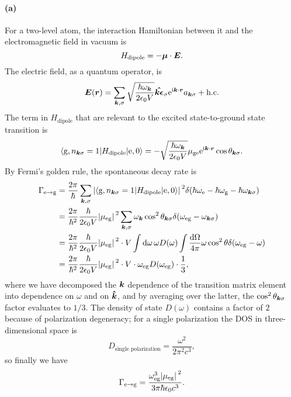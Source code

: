 \documentclass[hyperref, a4paper]{article}
\newcommand*{\ii}{\mathrm{i}}
\newcommand*{\ee}{\mathrm{e}}
\newcommand*{\omegae}{\omega_{\text{e}}}
\newcommand*{\omegag}{\omega_{\text{g}}}
\newcommand*{\omegaeg}{\omega_{\text{eg}}}
\newcommand*{\mueg}{\mu_{\text{eg}}}
\newcommand*{\muge}{\mu_{\text{ge}}}
\begin{document}
\paragraph{(a)} For a two-level atom, 
the interaction Hamiltonian between it and the electromagnetic field in vacuum is 
\begin{equation}
    H_{\text{dipole}} = - \vb*{\mu} \cdot \vb*{E}.
\end{equation}
The electric field, as a quantum operator, is 
\begin{equation}
    \vb*{E}(\vb*{r}) = \sum_{\vb*{k}, \sigma}
    \sqrt{\frac{\hbar \omega_{\vb*{k}}}{2 \epsilon_0 V}}
    \vu*{\vb*{k} \epsilon}_\sigma \ee^{\ii \vb*{k} \cdot \vb*{r}} a_{\vb*{k} \sigma} 
    + \text{h.c.}
\end{equation}
The term in $H_{\text{dipole}}$ that are relevant to 
the excited state-to-ground state transition is  
\begin{equation}
    \mel**{\text{g}, n_{\vb*{k} \sigma} = 1}{H_{\text{dipole}}}{\text{e}, 0}
    = - \sqrt{\frac{\hbar \omega_{\vb*{k}}}{2 \epsilon_0 V}} 
    \muge \ee^{\ii \vb*{k} \cdot \vb*{r}} \cos \theta_{\vb*{k} \sigma}.
\end{equation}
By Fermi's golden rule, the spontaneous decay rate is 
\begin{equation}
    \begin{aligned}
        \Gamma_{\text{e} \to \text{g}} &= 
        \frac{2\pi}{\hbar} \sum_{\vb*{k}, \sigma} 
        \abs*{
            \mel**{\text{g}, n_{\vb*{k} \sigma} = 1}{H_{\text{dipole}}}{\text{e}, 0}
        }^2
        \delta(\hbar \omegae - \hbar \omegag - \hbar \omega_{\vb*{k} \sigma}) \\
        &= \frac{2\pi}{\hbar^2} \frac{\hbar}{2 \epsilon_0 V}  \abs*{\mueg}^2 
        \sum_{\vb*{k}, \sigma} \omega_{\vb*{k}}
        \cos^2 \theta_{\vb*{k} \sigma} 
        \delta(\omegaeg - \omega_{\vb*{k} \sigma}) \\
        &= \frac{2\pi}{\hbar^2} \frac{\hbar}{2 \epsilon_0 V} \abs*{\mueg}^2 
        \cdot V \int \dd{\omega} \omega D(\omega) \int \frac{\dd{\Omega}}{4\pi} 
        \omega  \cos^2 \theta
        \delta(\omegaeg - \omega)  \\
        &= \frac{2\pi}{\hbar^2} \frac{\hbar}{2 \epsilon_0 V} \abs*{\mueg}^2 
        \cdot V \cdot \omegaeg D(\omegaeg) \cdot \frac{1}{3} ,
    \end{aligned}
\end{equation}
where we have decomposed the $\vb*{k}$ dependence 
of the transition matrix element 
into dependence on $\omega$ and on $\vu*{k}$,
and by averaging over the latter, 
the $\cos^2 \theta_{\vb*{k} \sigma}$  factor evaluates to $1/3$.
The density of state $D(\omega)$ contains a factor of $2$ 
because of polarization degeneracy;
for a single polarization the DOS in three-dimensional space is 
\begin{equation}
    D_{\text{single polarization}} = \frac{\omega^2}{2 \pi^2 c^3},
\end{equation}
so finally we have 
\begin{equation}
    \Gamma_{\text{e} \to \text{g}} = \frac{
        \omegaeg^3 \abs*{\mueg}^2
    }{
        3 \pi \hbar \epsilon_0 c^3
    }.
\end{equation}
\end{document}
